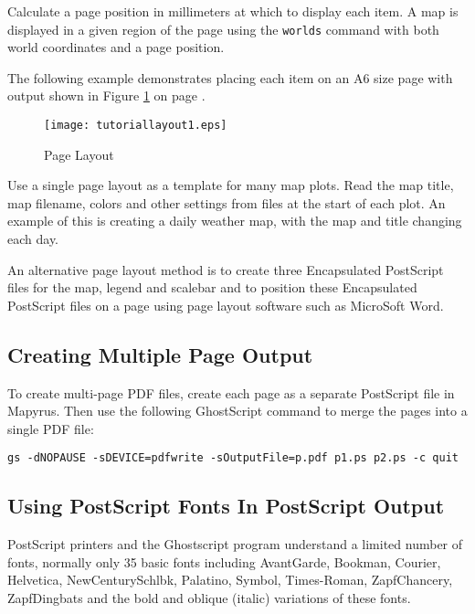 Calculate a page position in millimeters at which to display each item.
A map is displayed in a given region of the page using
the \texttt{worlds} command with both world coordinates
and a page position.

The following example demonstrates placing each item on an A6 size
page with output shown in Figure \ref{tutoriallayout1}
on page \pageref{tutoriallayout1}.



\begin{figure}[htb]
\texttt{[image: tutoriallayout1.eps]}
\caption{Page Layout}
\label{tutoriallayout1}
\end{figure}

Use a single page layout as a template for many map plots.  Read the map title,
map filename, colors and other settings from files at the start of each plot.
An example of this is creating a daily weather map, with the map and title
changing each day.

An alternative page layout method is to create three Encapsulated PostScript
files for the map, legend and scalebar and to position these Encapsulated
PostScript files on a page using page layout software such as MicroSoft Word.

\subsection{Creating Multiple Page Output}

To create multi-page PDF files, create each page as a separate
PostScript file in Mapyrus.  Then use the following GhostScript command to
merge the pages into a single PDF file:

\begin{verbatim}
gs -dNOPAUSE -sDEVICE=pdfwrite -sOutputFile=p.pdf p1.ps p2.ps -c quit
\end{verbatim}

\subsection{Using PostScript Fonts In PostScript Output}
\label{psfonts}

PostScript printers and the Ghostscript program
understand a limited number of fonts,
normally only 35 basic fonts including
AvantGarde,
Bookman,
Courier,
Helvetica,
NewCenturySchlbk,
Palatino,
Symbol,
Times-Roman,
ZapfChancery,
ZapfDingbats
and the bold
and oblique (italic) variations of these fonts.

